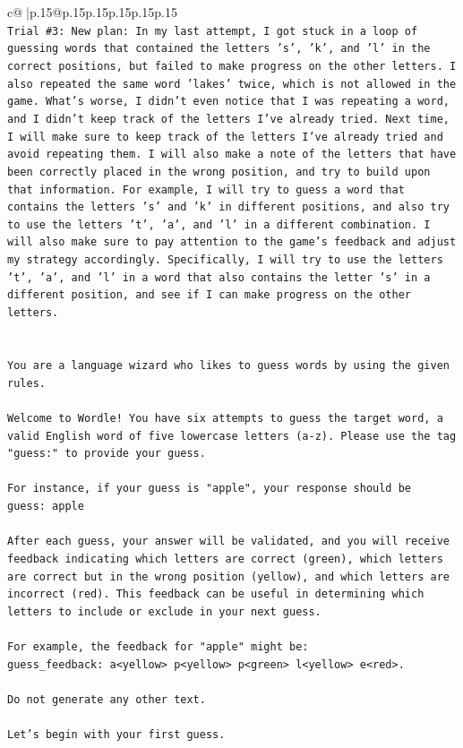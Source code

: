 \documentclass{article}
\begin{document}
{\begin{supertabular}{c@{$\;$}|p{.15\linewidth}@{}p{.15\linewidth}p{.15\linewidth}p{.15\linewidth}p{.15\linewidth}p{.15\linewidth}}
{{{\\ 
\texttt{Trial \#3: New plan: In my last attempt, I got stuck in a loop of guessing words that contained the letters 's', 'k', and 'l' in the correct positions, but failed to make progress on the other letters. I also repeated the same word 'lakes' twice, which is not allowed in the game. What's worse, I didn't even notice that I was repeating a word, and I didn't keep track of the letters I've already tried. Next time, I will make sure to keep track of the letters I've already tried and avoid repeating them. I will also make a note of the letters that have been correctly placed in the wrong position, and try to build upon that information. For example, I will try to guess a word that contains the letters 's' and 'k' in different positions, and also try to use the letters 't', 'a', and 'l' in a different combination. I will also make sure to pay attention to the game's feedback and adjust my strategy accordingly. Specifically, I will try to use the letters 't', 'a', and 'l' in a word that also contains the letter 's' in a different position, and see if I can make progress on the other letters.} \\
\\ 
\\ 
\texttt{You are a language wizard who likes to guess words by using the given rules.} \\
\\ 
\texttt{Welcome to Wordle! You have six attempts to guess the target word, a valid English word of five lowercase letters (a{-}z). Please use the tag "guess:" to provide your guess.} \\
\\ 
\texttt{For instance, if your guess is "apple", your response should be} \\
\texttt{guess: apple} \\
\\ 
\texttt{After each guess, your answer will be validated, and you will receive feedback indicating which letters are correct (green), which letters are correct but in the wrong position (yellow), and which letters are incorrect (red). This feedback can be useful in determining which letters to include or exclude in your next guess.} \\
\\ 
\texttt{For example, the feedback for "apple" might be:} \\
\texttt{guess\_feedback: a<yellow> p<yellow> p<green> l<yellow> e<red>.} \\
\\ 
\texttt{Do not generate any other text.} \\
\\ 
\texttt{Let's begin with your first guess.} \\
            }
        }
    }
     \\ \\


\end{supertabular}}
\end{document}
